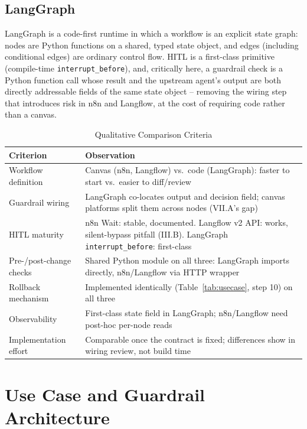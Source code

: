 \documentclass[conference]{IEEEtran}
\begin{document}
\subsection{LangGraph}
LangGraph is a code-first runtime in which a workflow is an explicit state graph: nodes are Python functions on a shared, typed state object, and edges (including conditional edges) are ordinary control flow. HITL is a first-class primitive (compile-time \texttt{interrupt\_before}), and, critically here, a guardrail check is a Python function call whose result and the upstream agent's output are both directly addressable fields of the same state object -- removing the wiring step that introduces risk in n8n and Langflow, at the cost of requiring code rather than a canvas.

\begin{table}[!t]
\caption{Qualitative Comparison Criteria}
\label{tab:criteria}
\centering
\footnotesize
\begin{tabularx}{\columnwidth}{@{}l X@{}}
\hline
\textbf{Criterion} & \textbf{Observation} \\
\hline
Workflow definition & Canvas (n8n, Langflow) vs.\ code (LangGraph): faster to start vs.\ easier to diff/review \\
Guardrail wiring & LangGraph co-locates output and decision field; canvas platforms split them across nodes (VII.A's gap) \\
HITL maturity & n8n Wait: stable, documented. Langflow v2 API: works, silent-bypass pitfall (III.B). LangGraph \texttt{interrupt\_before}: first-class \\
Pre-/post-change checks & Shared Python module on all three: LangGraph imports directly, n8n/Langflow via HTTP wrapper \\
Rollback mechanism & Implemented identically (Table~\ref{tab:usecase}, step 10) on all three \\
Observability & First-class state field in LangGraph; n8n/Langflow need post-hoc per-node reads \\
Implementation effort & Comparable once the contract is fixed; differences show in wiring review, not build time \\
\hline
\end{tabularx}
\end{table}

\section{Use Case and Guardrail Architecture}
\end{document}
